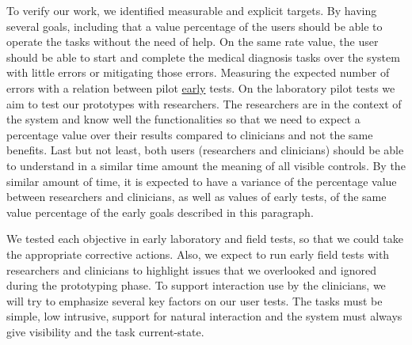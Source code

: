To verify our work, we identified measurable and explicit targets. By having several goals, including that a value percentage of the users should be able to operate the tasks without the need of help. On the same rate value, the user should be able to start and complete the medical diagnosis tasks over the system with little errors or mitigating those errors. Measuring the expected number of errors with a relation between pilot \hyperlink{https://github.com/MIMBCD-UI/testing-guide-breast/tree/master/samples/test_4}{early} tests. On the laboratory pilot tests we aim to test our prototypes with researchers. The researchers are in the context of the system and know well the functionalities so that we need to expect a percentage value over their results compared to clinicians and not the same benefits. Last but not least, both users (researchers and clinicians) should be able to understand in a similar time amount the meaning of all visible controls. By the similar amount of time, it is expected to have a variance of the percentage value between researchers and clinicians, as well as values of early tests, of the same value percentage of the early goals described in this paragraph.

We tested each objective in early laboratory and field tests, so that we could take the appropriate corrective actions. Also, we expect to run early field tests with researchers and clinicians to highlight issues that we overlooked and ignored during the prototyping phase. To support interaction use by the clinicians, we will try to emphasize several key factors on our user tests. The tasks must be simple, low intrusive, support for natural interaction and the system must always give visibility and the task current-state.